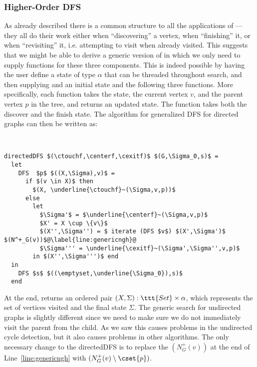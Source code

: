 \newcommand{\ctouchf}{\ttt{revisit}}
\newcommand{\centerf}{\ttt{discover}}
\newcommand{\cexitf}{\ttt{finish}}

\subsubsection{Higher-Order DFS}

As already described there is a common structure to all the
applications of \dfs{}---they all do their work either when
``discovering'' a vertex, when ``finishing'' it, or when
``revisiting'' it, i.e. attempting to visit when already visited.
This suggests that we might be able to derive a generic version of
\dfs{} in which we only need to supply functions for these three
components.  This is indeed possible by having the user define a state
of type $\alpha$ that can be threaded throughout search, and then
supplying and an initial state and the following three functions.
More specifically, each function takes the state, the current vertex
$v$, and the parent vertex $p$ in the \dfs{} tree, and returns an
updated state.  The \cexitf{} function takes both the discover and the
finish state.  The algorithm for generalized DFS for directed graphs
can then be written as:


\begin{algorithm}
~\\
\begin{lstlisting}
directedDFS $(\ctouchf,\centerf,\cexitf)$ $(G,\Sigma_0,s)$ = 
  let
    DFS  $p$ $((X,\Sigma),v)$ =
      if $(v \in X)$ then 
        $(X, \underline{\ctouchf}~(\Sigma,v,p))$
      else
        let
          $\Sigma'$ = $\underline{\centerf}~(\Sigma,v,p)$
          $X' = X \cup \{v\}$
          $(X'',\Sigma'') = $ iterate (DFS $v$) $(X',\Sigma')$ $(N^+_G(v))$@\label{line:genericngh}@
          $\Sigma''' = \underline{\cexitf}~(\Sigma',\Sigma'',v,p)$
        in $(X'',\Sigma''')$ end
  in 
    DFS $s$ $((\emptyset,\underline{\Sigma_0}),s)$ 
  end
\end{lstlisting}
\end{algorithm}

At the end, \dfs{} returns an ordered pair $(X, \Sigma) : \ttt{Set}
\times \alpha$, which represents the set of vertices visited and the
final state $\Sigma$.  The generic search for undirected graphs is
slightly different since we need to make sure we do not immediately
visit the parent from the child.  As we saw this causes problems in
the undirected cycle detection, but it also causes problems in other
algorithms.  The only necessary change to the directedDFS is to
replace the $(N^+_G(v))$ at the end of Line~\ref{line:genericngh} with
$(N^+_G(v) \setminus \cset{p})$.

